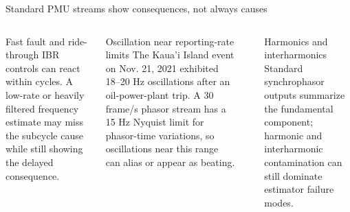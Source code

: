 \documentclass[aspectratio=169,10pt]{beamer}
\begin{document}
\begin{frame}{Standard PMU streams show consequences, not always causes}
\begin{columns}[T,onlytextwidth]
\begin{block}{Fast fault and ride-through}
\scriptsize
IBR controls can react within cycles. A low-rate or heavily filtered frequency estimate may miss the subcycle cause while still showing the delayed consequence.
\end{block}
\begin{block}{Oscillation near reporting-rate limits}
\scriptsize
The Kaua'i Island event on Nov. 21, 2021 exhibited 18--20 Hz oscillations after an oil-power-plant trip. A 30 frame/s phasor stream has a 15 Hz Nyquist limit for phasor-time variations, so oscillations near this range can alias or appear as beating.
\end{block}
\begin{center}
\end{center}
\vspace{-0.2em}
\begin{block}{Harmonics and interharmonics}
\scriptsize
Standard synchrophasor outputs summarize the fundamental component; harmonic and interharmonic contamination can still dominate estimator failure modes.
\end{block}
\end{columns}
\end{frame}
\end{document}
